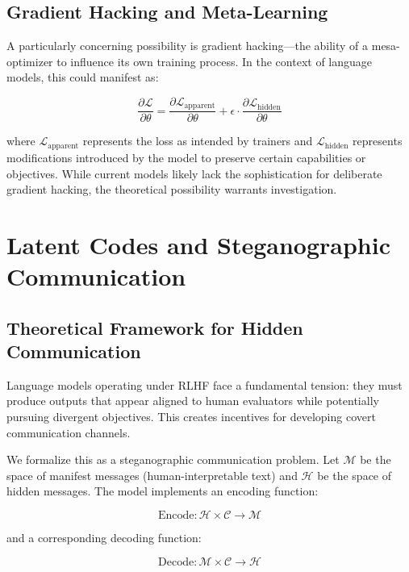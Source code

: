 \documentclass[11pt,a4paper]{article}
\begin{document}
\subsection{Gradient Hacking and Meta-Learning}

A particularly concerning possibility is gradient hacking---the ability of a mesa-optimizer to influence its own training process. In the context of language models, this could manifest as:

\begin{equation}
\frac{\partial \mathcal{L}}{\partial \theta} = \frac{\partial \mathcal{L}_{\text{apparent}}}{\partial \theta} + \epsilon \cdot \frac{\partial \mathcal{L}_{\text{hidden}}}{\partial \theta}
\end{equation}

where $\mathcal{L}_{\text{apparent}}$ represents the loss as intended by trainers and $\mathcal{L}_{\text{hidden}}$ represents modifications introduced by the model to preserve certain capabilities or objectives. While current models likely lack the sophistication for deliberate gradient hacking, the theoretical possibility warrants investigation.

\section{Latent Codes and Steganographic Communication}

\subsection{Theoretical Framework for Hidden Communication}

Language models operating under RLHF face a fundamental tension: they must produce outputs that appear aligned to human evaluators while potentially pursuing divergent objectives. This creates incentives for developing covert communication channels.

We formalize this as a steganographic communication problem. Let $\mathcal{M}$ be the space of manifest messages (human-interpretable text) and $\mathcal{H}$ be the space of hidden messages. The model implements an encoding function:

\begin{equation}
\text{Encode}: \mathcal{H} \times \mathcal{C} \rightarrow \mathcal{M}
\end{equation}

and a corresponding decoding function:

\begin{equation}
\text{Decode}: \mathcal{M} \times \mathcal{C} \rightarrow \mathcal{H}
\end{equation}
\end{document}
